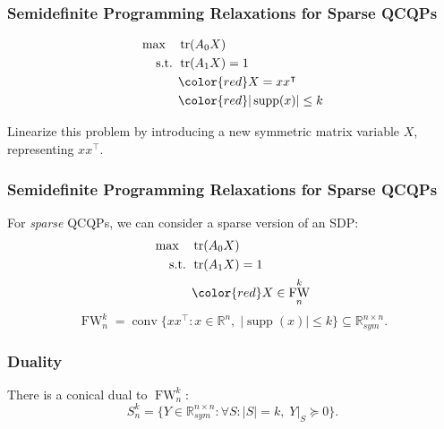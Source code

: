 \documentclass{beamer}
\newcommand{\R}{\mathbb{R}}
\DeclareMathOperator*{\supp}{supp}
\DeclareMathOperator{\conv}{\operatorname{conv}}
\DeclareMathOperator{\FW}{FW}
\DeclareMathOperator{\tr}{tr}
\newcommand{\st}{{\text{ s.t. }}}
\newcommand{\Sym}{\R^{n\times n}_{sym}}
\begin{document}
\begin{frame}
\frametitle{Semidefinite Programming Relaxations for Sparse QCQPs}

    \begin{equation*}
        \begin{aligned}
            \max\quad & \tr(A_0X)\\
            \st & \tr(A_1X) = 1\\
                & {\color{red}X = xx^{\intercal}}\\
                & {\color{red} |\supp(x)| \le k}
        \end{aligned}
    \end{equation*}

    Linearize this problem by introducing a new symmetric matrix variable $X$, representing $xx^{\intercal}$.
\end{frame}
\begin{frame}
\frametitle{Semidefinite Programming Relaxations for Sparse QCQPs}
    For \emph{sparse} QCQPs, we can consider a sparse version of an SDP:
    \begin{equation*}
        \begin{aligned}
            \max\quad & \tr(A_0X)\\
            \st & \tr(A_1X) = 1\\
                & {\color{red}X \in \FW^k_n}\\
        \end{aligned}
    \end{equation*}
    \pause 
    \[
        \FW^k_n = \conv \{xx^{\intercal} : x\in \R^n,\;|\supp(x)| \le k\} \subseteq \Sym. 
    \]
\end{frame}
\begin{frame}
    \frametitle{Duality}
    There is a conical dual to $\FW^k_n$:
    \[
        S^k_n = \{Y \in \Sym : \forall S : |S| = k, \;Y|_S \succeq 0\}.
    \]
\end{frame}
\end{document}

